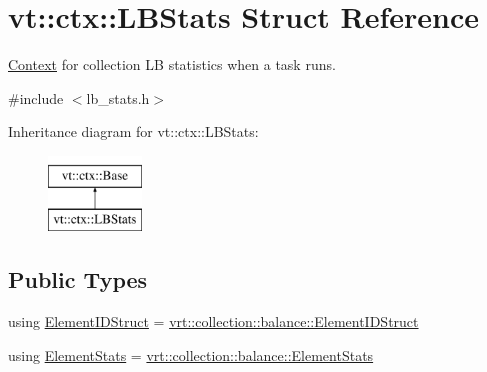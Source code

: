 \hypertarget{structvt_1_1ctx_1_1_l_b_stats}{}\section{vt\+:\+:ctx\+:\+:L\+B\+Stats Struct Reference}
\label{structvt_1_1ctx_1_1_l_b_stats}


\hyperlink{structvt_1_1ctx_1_1_context}{Context} for collection LB statistics when a task runs.  




{\ttfamily \#include $<$lb\+\_\+stats.\+h$>$}

Inheritance diagram for vt\+:\+:ctx\+:\+:L\+B\+Stats\+:\begin{figure}[H]
\begin{center}
\leavevmode
\includegraphics[height=2.000000cm]{structvt_1_1ctx_1_1_l_b_stats}
\end{center}
\end{figure}
\subsection*{Public Types}
\begin{DoxyCompactItemize}
\item 
using \hyperlink{structvt_1_1ctx_1_1_l_b_stats_a9806d27212bffbbac72eb1e05f9e9880}{Element\+I\+D\+Struct} = \hyperlink{structvt_1_1vrt_1_1collection_1_1balance_1_1_element_i_d_struct}{vrt\+::collection\+::balance\+::\+Element\+I\+D\+Struct}
\item 
using \hyperlink{structvt_1_1ctx_1_1_l_b_stats_aaf24fff3db7252f70df0a02e12966eb4}{Element\+Stats} = \hyperlink{structvt_1_1vrt_1_1collection_1_1balance_1_1_element_stats}{vrt\+::collection\+::balance\+::\+Element\+Stats}
\end{DoxyCompactItemize}
